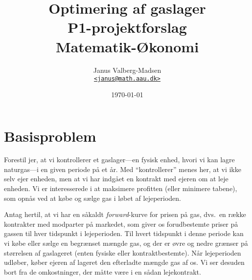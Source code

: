 \documentclass[12pt,oneside,final]{article}
\title{
  Optimering af gaslager\\
  \large P1-projektforslag \\
  Matematik-{\O}konomi
}
\author{
  Janus Valberg-Madsen\\
  \href{mailto:janus@math.aau.dk}{\texttt{<janus@math.aau.dk>}}
}
\date{\today}
\newcommand{\1}{\mathbbm{1}}
\begin{document}
\maketitle
\begin{center}
\end{center}
\tableofcontents


\clearpage
\section{Basisproblem}
Forestil jer, at vi kontrollerer et gaslager---en fysisk enhed, hvori vi kan lagre naturgas---i en given periode på et år.
Med ``kontrollerer'' menes her, at vi ikke selv ejer enheden, men at vi har indgået en kontrakt med ejeren om at leje enheden.
Vi er interesserede i at maksimere profitten (eller minimere tabene), som opnås ved at købe og sælge gas i løbet af lejeperioden.

Antag hertil, at vi har en såkaldt \emph{forward}-kurve for prisen på gas, dvs.\ en række kontrakter med modparter på markedet, som giver os forudbestemte priser på gassen til hver tidspunkt i lejeperioden.
Til hvert tidspunkt i denne periode kan vi købe eller sælge en begrænset mængde gas, og der er øvre og nedre grænser på størrelsen af gaslageret (enten fysiske eller kontraktbestemte).
Når lejeperioden udløber, køber ejeren af lageret den efterladte mængde gas af os.
Vi ser desuden bort fra de omkostninger, der måtte være i en sådan lejekontrakt.
\end{document}
